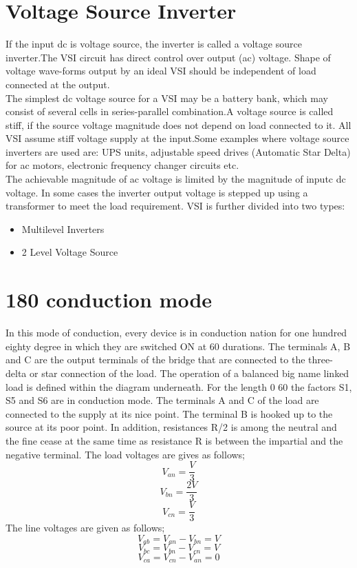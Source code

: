 \section{Voltage Source Inverter}
 If the input dc is voltage source, the inverter is called a voltage
source inverter.The VSI circuit has direct control over output (ac)
voltage. Shape of voltage wave-forms output by an ideal VSI should be independent of load connected at the output.\\
The simplest dc voltage source for a VSI may be a battery bank, which may consist of several cells in series-parallel combination.A voltage source is called stiff, if the source voltage magnitude does not depend on load connected to it. All VSI assume stiff voltage supply at the input.Some examples where voltage source inverters are used are: UPS units, adjustable speed drives (Automatic Star Delta) for ac motors, electronic frequency changer circuits etc.\\
The achievable magnitude of ac voltage is limited by the magnitude of inputc dc voltage. In some cases the inverter output voltage is stepped up using a transformer to meet the load requirement. 
VSI is further divided into two types:
\begin{itemize}
\item Multilevel Inverters
\item 2 Level Voltage Source
\end{itemize}
\section{180 conduction mode}
In this mode of conduction, every device is in conduction nation for one hundred eighty
degree in which they are switched ON at 60 durations. The terminals A, B and C are the
output terminals of the bridge that are connected to the three- delta or star connection
of the load. The operation of a balanced big name linked load is defined within the
diagram underneath. For the length 0 60 the factors S1, S5 and S6 are in conduction
mode. The terminals A and C of the load are connected to the supply at its nice point.
The terminal B is hooked up to the source at its poor point. In addition, resistances
R/2 is among the neutral and the fine cease at the same time as resistance R is between
the impartial and the negative terminal. The load voltages are gives as follows;
\begin{equation}
	V_{an}=\frac{V}{3}
\end{equation}
\begin{equation}
	V_{bn}=\frac{2V}{3}
\end{equation}
\begin{equation}
	V_{cn}=\frac{V}{3}
\end{equation}
The line voltages are given as follows;
\begin{equation}
	V_{ab}=V_{an}-V_{bn}=V
\end{equation}
\begin{equation}
	V_{bc}=V_{bn}-V_{cn}=V
\end{equation}
\begin{equation}
	V_{ca}=V_{cn}-V_{an}=0
\end{equation}

